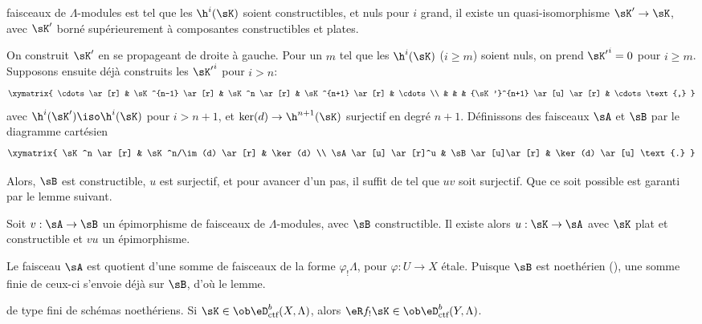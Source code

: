 \begin{lemma_}\label{II:4-7}
 faisceaux de $\Lambda$-modules est tel que les 
$\h^i(\sK)$ soient constructibles, et nuls pour $i$ grand, il existe un 
quasi-isomorphisme $\sK'\to \sK$, avec $\sK'$ borné supérieurement à 
composantes constructibles et plates.
\end{lemma_}

On construit $\sK'$ en se propageant de droite à gauche. Pour un $m$ tel que les 
$\h^i(\sK)$ ($i\geqslant m$) soient nuls, on prend ${\sK'}^i = 0$ pour 
$i\geqslant m$. Supposons ensuite déjà construits les ${\sK'}^i$ pour 
$i>n$:
\[\xymatrix{
  \cdots \ar[r] 
    & \sK^{n-1} \ar[r] 
    & \sK^n \ar[r] 
    & \sK^{n+1} \ar[r] 
    & \cdots \\
  & & & {\sK'}^{n+1} \ar[u] \ar[r] 
    & \cdots \text{,}
}\]
avec $\h^i(\sK')\iso \h^i(\sK)$ pour $i>n+1$, et $\ker(d)\to\h^{n+1}(\sK)$ surjectif 
en degré $n+1$. Définissons des faisceaux $\sA$ et $\sB$ par le diagramme 
cartésien 
\[\xymatrix{
  \sK^n \ar[r] 
    & \sK^n/\im(d) \ar[r] 
    & \ker(d) \\
  \sA \ar[u] \ar[r]^u 
    & \sB \ar[u]\ar[r] 
    & \ker(d) \ar[u] \text{.}
}\]

Alors, $\sB$ est constructible, $u$ est surjectif, et pour avancer d'un pas, il 
suffit de  tel que
$u v$ soit surjectif. Que ce soit possible est garanti par le lemme suivant. 





\begin{lemma_}\label{II:4-8}
Soit $v:\sA\to \sB$ un épimorphisme de faisceaux de $\Lambda$-modules, avec 
$\sB$ constructible. Il existe alors $u:\sK\to \sA$ avec $\sK$ plat et 
constructible et $v u$ un épimorphisme. 
\end{lemma_}

Le faisceau $\sA$ est quotient d'une somme de faisceaux de la forme 
$\varphi_! \Lambda$, pour $\varphi:U\to X$ étale. Puisque $\sB$ est noethérien 
(\cite[IX.2.10]{sga4}), une somme finie de ceux-ci s'envoie déjà sur $\sB$, 
d'où le lemme. 





\begin{theorem_}\label{II:4-9}
 de type fini de schémas noethériens. 
Si $\sK\in\ob\eD_\textnormal{ctf}^b(X,\Lambda)$, alors 
$\eR f_!\sK\in \ob\eD_\textnormal{ctf}^b(Y,\Lambda)$. 
\end{theorem_}

